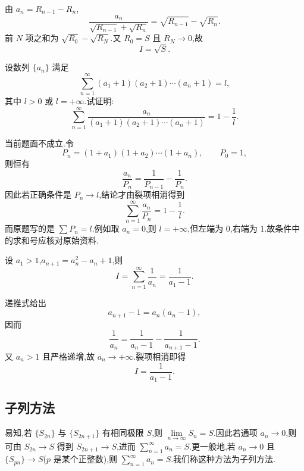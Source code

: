 \begin{solution}
    由 $a_n=R_{n-1}-R_n$,
    \[
        \dfrac{a_n}{\sqrt{R_{n-1}}+\sqrt{R_n}}
        =\sqrt{R_{n-1}}-\sqrt{R_n}.
    \]
    前 $N$ 项之和为 $\sqrt{R_0}-\sqrt{R_N}$.又 $R_0=S$ 且 $R_N\to0$,故
    \[
        I=\boxed{\sqrt S}.
    \]
\end{solution}

\begin{example}
    设数列 $\{a_n\}$ 满足
    \[
        \displaystyle\sum\limits_{n=1}^{\infty}(a_1+1)(a_2+1)\cdots(a_n+1)=l,
    \]
    其中 $l>0$ 或 $l=+\infty$.试证明:
    \[
        \displaystyle\sum\limits_{n=1}^{\infty}
        \dfrac{a_n}{(a_1+1)(a_2+1)\cdots(a_n+1)}
        =1-\dfrac{1}{l}.
    \]
\end{example}
\exampleblank

\begin{solution}
    当前题面不成立.令
    \[
        P_n=(1+a_1)(1+a_2)\cdots(1+a_n),\qquad P_0=1,
    \]
    则恒有
    \[
        \dfrac{a_n}{P_n}=\dfrac{1}{P_{n-1}}-\dfrac{1}{P_n}.
    \]
    因此若正确条件是 $P_n\to l$,结论才由裂项相消得到
    \[
        \displaystyle\sum\limits_{n=1}^{\infty}\dfrac{a_n}{P_n}=1-\dfrac{1}{l}.
    \]
    而原题写的是 $\displaystyle \sum P_n=l$.例如取 $a_n=0$,则 $l=+\infty$,但左端为 $0$,右端为 $1$.故条件中的求和号应核对原始资料.
\end{solution}

\begin{example}
    设 $a_1>1$,$a_{n+1}=a_n^2-a_n+1$,则
    \[
        I=\sum\limits_{n=1}^{\infty}\dfrac{1}{a_n}=\dfrac{1}{a_1-1}.
    \]
\end{example}
\exampleblank

\begin{solution}
    递推式给出
    \[
        a_{n+1}-1=a_n(a_n-1),
    \]
    因而
    \[
        \dfrac{1}{a_n}
        =\dfrac{1}{a_n-1}-\dfrac{1}{a_{n+1}-1}.
    \]
    又 $a_n>1$ 且严格递增,故 $a_n\to+\infty$.裂项相消即得
    \[
        I=\boxed{\dfrac{1}{a_1-1}}.
    \]
\end{solution}



\subsection{子列方法}

易知,若 $\{S_{2n}\}$ 与 $\{S_{2n+1}\}$ 有相同极限 $S$,则 $\displaystyle\lim\limits_{n\to\infty}S_n=S$.因此若通项 $a_n\to0$,则可由 $S_{2n}\to S$ 得到 $S_{2n+1}\to S$,进而 $\displaystyle\sum\limits_{n=1}^{\infty}a_n=S$.更一般地,若 $a_n\to0$ 且 $\{S_{pn}\}\to S$($p$ 是某个正整数),则 $\displaystyle\sum\limits_{n=1}^{\infty}a_n=S$.我们称这种方法为子列方法.

